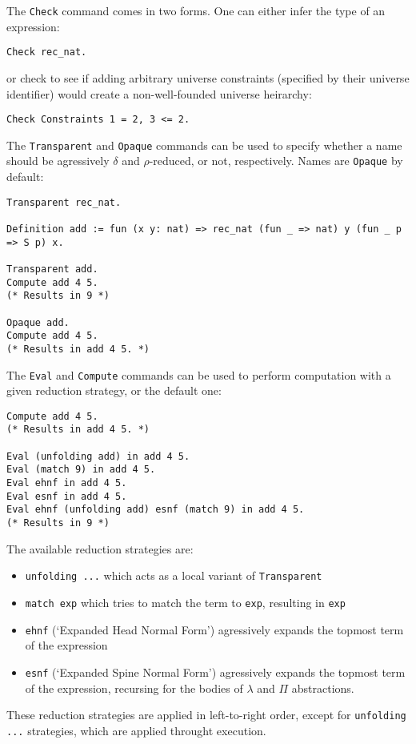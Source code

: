 \documentclass{article}
\begin{document}
The \texttt{Check} command comes in two forms. One can either infer the type of an expression:
\begin{lstlisting}
Check rec_nat.
\end{lstlisting}
or check to see if adding arbitrary universe constraints (specified by their universe identifier) would create a non-well-founded universe heirarchy:
\begin{lstlisting}
Check Constraints 1 = 2, 3 <= 2.
\end{lstlisting}

The \texttt{Transparent} and \texttt{Opaque} commands can be used to specify whether a name should be agressively $\delta$ and $\rho$-reduced, or not, respectively. Names are \texttt{Opaque} by default:
\begin{lstlisting}
Transparent rec_nat.

Definition add := fun (x y: nat) => rec_nat (fun _ => nat) y (fun _ p => S p) x.

Transparent add.
Compute add 4 5.
(* Results in 9 *)

Opaque add.
Compute add 4 5.
(* Results in add 4 5. *)
\end{lstlisting}

The \texttt{Eval} and \texttt{Compute} commands can be used to perform computation with a given reduction strategy, or the default one:
\begin{lstlisting}
Compute add 4 5.
(* Results in add 4 5. *)

Eval (unfolding add) in add 4 5.
Eval (match 9) in add 4 5.
Eval ehnf in add 4 5.
Eval esnf in add 4 5.
Eval ehnf (unfolding add) esnf (match 9) in add 4 5.
(* Results in 9 *)
\end{lstlisting}

The available reduction strategies are:
\begin{itemize}
    \item \texttt{unfolding ...} which acts as a local variant of \texttt{Transparent}
    \item \texttt{match exp} which tries to match the term to \texttt{exp}, resulting in \texttt{exp}
    \item \texttt{ehnf} (`Expanded Head Normal Form') agressively expands the topmost term of the expression
    \item \texttt{esnf} (`Expanded Spine Normal Form') agressively expands the topmost term of the expression, recursing for the bodies of $\lambda$ and $\Pi$ abstractions.
\end{itemize}

These reduction strategies are applied in left-to-right order, except for \texttt{unfolding ...} strategies, which are applied throught execution.
\end{document}
